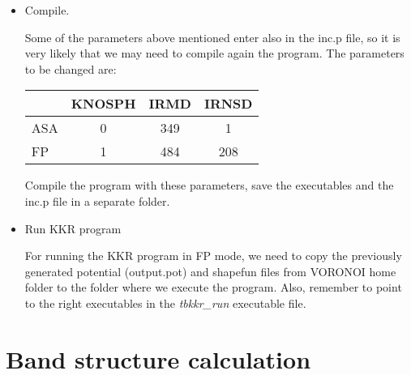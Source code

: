 \documentclass[11pt,fleqn]{book} %
\begin{document}
\begin{itemize}
\item Compile.

Some of the parameters above mentioned enter also in the inc.p file, so
it is very likely that we may need to compile again the program. The
parameters to be changed are:
\begin{tabular}{ l | c | c |  c }
      & KNOSPH & IRMD & IRNSD \\
  \hline
  ASA & 0 & 349 & 1 \\
  FP  & 1 & 484 & 208 \\
\end{tabular}

Compile the program with these parameters, save the executables and the inc.p file
in a separate folder.

\item Run KKR program

For running the KKR program in FP mode, we need to copy the
previously generated potential (output.pot) and shapefun files from VORONOI
home folder to the folder where we execute the program. Also,
remember to point to the right executables in the \textit{tbkkr\_run}
executable file.

\end{itemize}




\section{Band structure calculation}
\label{sec:bandstructure}
\end{document}
